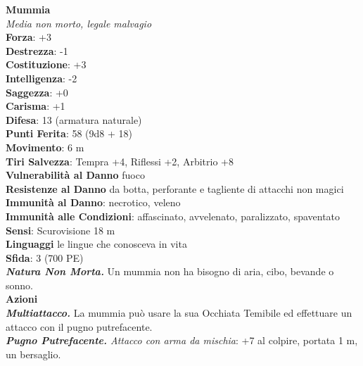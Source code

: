 \begin{multicols}{2}
\medskip\textbf{Mummia}\\
\emph{Media non morto, legale malvagio}\\
\textbf{Forza}: +3\\
\textbf{Destrezza}: -1\\
\textbf{Costituzione}: +3\\
\textbf{Intelligenza}: -2\\
\textbf{Saggezza}: +0\\
\textbf{Carisma}: +1\\
\textbf{Difesa}: 13 (armatura naturale)\\
\textbf{Punti Ferita}: 58 (9d8 + 18)\\
\textbf{Movimento}: 6 m\\
\textbf{Tiri Salvezza}: Tempra +4, Riflessi +2, Arbitrio +8\\
\textbf{Vulnerabilità al Danno} fuoco\\
\textbf{Resistenze al Danno} da botta, perforante e tagliente di attacchi non magici\\
\textbf{Immunità al Danno}: necrotico, veleno\\
\textbf{Immunità alle Condizioni}: affascinato, avvelenato, paralizzato, spaventato\\
\textbf{Sensi}: Scurovisione 18 m \\
\textbf{Linguaggi} le lingue che conosceva in vita\\
\textbf{Sfida}: 3 (700 PE)\smallskip\\
\emph{\textbf{Natura Non Morta.}} Un mummia non ha bisogno di aria, cibo, bevande o sonno.\\
\smallskip\textbf{Azioni}\\
\emph{\textbf{Multiattacco.}} La mummia può usare la sua Occhiata Temibile ed effettuare un attacco con il pugno putrefacente.\\

\emph{\textbf{Pugno Putrefacente.} Attacco con arma da mischia}: +7 al colpire, portata 1 m, un bersaglio.\\


\end{multicols}

